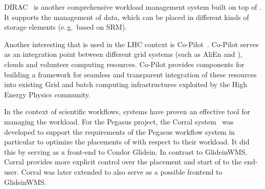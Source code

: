 \documentclass{sig-alternate}
\begin{document}
DIRAC~\cite{1742-6596-219-6-062049} is another comprehensive workload
management system built on top of \pilots. It supports the management of data,
which can be placed in different kinds of storage elements (e.\,g.\ based on
SRM).

Another interesting \pilot that is used in the LHC context is
Co-Pilot~\cite{copilot-tr}. Co-Pilot serves as an integration point between
different grid \pilotjob systems (such as AliEn and \panda), clouds and
volunteer computing resources. Co-Pilot provides components for building a
framework for seamless and transparent integration of these resources into
existing Grid and batch computing infrastructures exploited by the High Energy
Physics community.



In the context of scientific workflows, \pilotjob systems have proven an
effective tool for managing the workload. For the Pegasus project, the Corral
system~\cite{Rynge:2011:EUG:2116259.2116599} was developed to support the
requirements of the Pegasus workflow system in particular to optimize the
placements of \pilots with respect to their workload. It did this by serving as
a front-end to Condor Glidein. In contrast to GlideinWMS, Corral provides more
explicit control over the placement and start of \pilots to the end-user.
Corral was later extended to also serve as a possible frontend to GlideinWMS.
\end{document}
